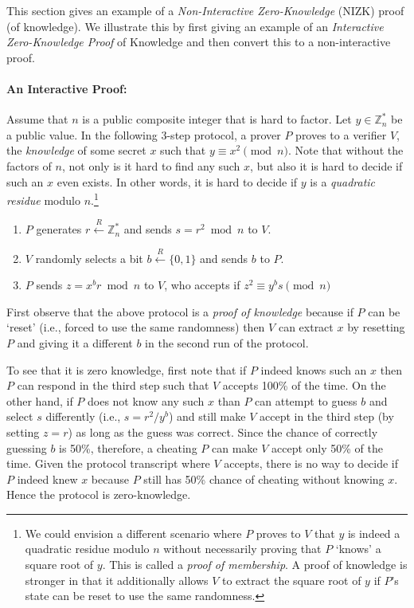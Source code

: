 \documentclass[]{report}   %
\newcommand{\rand}{\stackrel{R}{\leftarrow}}
\begin{document}
This section gives an example of a {\em Non-Interactive Zero-Knowledge} (NIZK) proof (of knowledge). We illustrate this by first giving an example of an {\em Interactive Zero-Knowledge Proof} of Knowledge and then convert this to a non-interactive proof. 

\paragraph{An Interactive Proof:} Assume that $n$ is a public composite integer that is hard to factor.
Let $y\in \mathbb{Z}^*_n$ be a public value. In the following 3-step protocol, a prover $P$ proves to a verifier $V$, the {\em knowledge} of some secret $x$ such that $y\equiv x^2 \pmod{n}$.
Note that without the factors of $n$, not only is it hard to find any such $x$, but also it is hard to decide if such an $x$ even exists. In other words, it is hard to decide if $y$ is a {\em  quadratic residue} modulo $n$.\footnote{We could envision a different scenario where $P$ proves to $V$ that $y$ is indeed a quadratic residue modulo $n$ without necessarily proving that $P$ `knows' a square root of $y$. This is called a {\em proof of membership}. A proof of knowledge is stronger in that it additionally allows $V$ to extract the square root of $y$ if $P$'s state can be reset to use the same randomness.}


\begin{enumerate}
	\item $P$ generates $r\rand \mathbb{Z}^*_n$ and sends $s = r^2\bmod{n}$ to $V$.
	\item $V$ randomly selects a bit $b\rand \{0, 1\}$ and sends $b$ to $P$.
	\item $P$ sends $z=x^br \bmod{n}$ to $V$, who accepts if $z^2 \equiv y^bs\pmod{n}$
\end{enumerate}

First observe that the above protocol is a {\em proof of knowledge} because if $P$ can be `reset' (i.e., forced to use the same randomness) then $V$ can extract $x$ by resetting $P$ and giving it a different $b$ in the second run of the protocol. 

To see that it is zero knowledge, first note that if $P$ indeed knows such an $x$ then $P$ can respond in the third step such that $V$ accepts 100\% of the time. On the other hand, if $P$ does not know any such $x$ than $P$ can attempt to guess $b$ and select $s$ differently (i.e., $s=r^2/y^b$) and still make $V$ accept in the third step (by setting $z=r$) as long as the guess was correct. 
Since the chance of correctly guessing $b$ is 50\%, therefore, a cheating $P$ can make $V$ accept only 50\% of the time. 
Given the protocol transcript where $V$ accepts, there is no way to decide if $P$ indeed knew $x$ because $P$ still has 50\% chance of cheating without knowing $x$. Hence the protocol is zero-knowledge.
\end{document}
